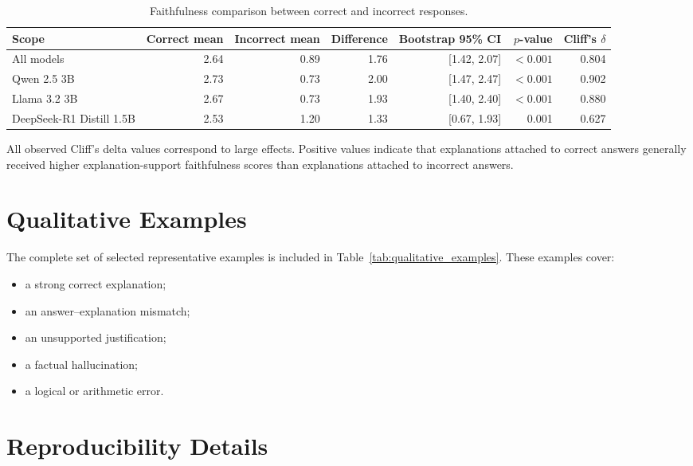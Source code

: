 \documentclass{article}
\begin{document}
\begin{table}[t]
\centering
\small
\caption{Faithfulness comparison between correct and incorrect
responses.}
\label{tab:appendix_statistics}
\begin{tabular}{lrrrrrr}
\toprule
\textbf{Scope} &
\textbf{Correct mean} &
\textbf{Incorrect mean} &
\textbf{Difference} &
\textbf{Bootstrap 95\% CI} &
\textbf{$p$-value} &
\textbf{Cliff's $\delta$} \\
\midrule
All models &
2.64 &
0.89 &
1.76 &
[1.42, 2.07] &
$<0.001$ &
0.804 \\

Qwen 2.5 3B &
2.73 &
0.73 &
2.00 &
[1.47, 2.47] &
$<0.001$ &
0.902 \\

Llama 3.2 3B &
2.67 &
0.73 &
1.93 &
[1.40, 2.40] &
$<0.001$ &
0.880 \\

DeepSeek-R1 Distill 1.5B &
2.53 &
1.20 &
1.33 &
[0.67, 1.93] &
0.001 &
0.627 \\
\bottomrule
\end{tabular}
\end{table}

All observed Cliff's delta values correspond to large effects. Positive
values indicate that explanations attached to correct answers generally
received higher explanation-support faithfulness scores than
explanations attached to incorrect answers.

\section{Qualitative Examples}
\label{app:qualitative}

The complete set of selected representative examples is included in
Table~\ref{tab:qualitative_examples}. These examples cover:

\begin{itemize}
    \item a strong correct explanation;
    \item an answer--explanation mismatch;
    \item an unsupported justification;
    \item a factual hallucination;
    \item a logical or arithmetic error.
\end{itemize}



\section{Reproducibility Details}
\label{app:reproducibility}
\end{document}
